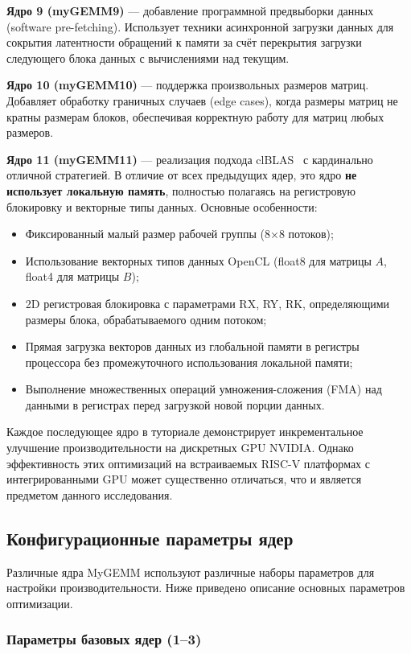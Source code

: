 \textbf{Ядро 9 (myGEMM9)} --- добавление программной предвыборки данных (software pre-fetching). Использует техники асинхронной загрузки данных для сокрытия латентности обращений к памяти за счёт перекрытия загрузки следующего блока данных с вычислениями над текущим.

\textbf{Ядро 10 (myGEMM10)} --- поддержка произвольных размеров матриц. Добавляет обработку граничных случаев (edge cases), когда размеры матриц не кратны размерам блоков, обеспечивая корректную работу для матриц любых размеров.

\textbf{Ядро 11 (myGEMM11)} --- реализация подхода clBLAS~\cite{clblas2015} с кардинально отличной стратегией. В отличие от всех предыдущих ядер, это ядро \textbf{не использует локальную память}, полностью полагаясь на регистровую блокировку и векторные типы данных. Основные особенности:

\begin{itemize}
    \item Фиксированный малый размер рабочей группы (8×8 потоков);
    \item Использование векторных типов данных OpenCL (float8 для матрицы $A$, float4 для матрицы $B$);
    \item 2D регистровая блокировка с параметрами RX, RY, RK, определяющими размеры блока, обрабатываемого одним потоком;
    \item Прямая загрузка векторов данных из глобальной памяти в регистры процессора без промежуточного использования локальной памяти;
    \item Выполнение множественных операций умножения-сложения (FMA) над данными в регистрах перед загрузкой новой порции данных.
\end{itemize}

Каждое последующее ядро в туториале демонстрирует инкрементальное улучшение производительности на дискретных GPU NVIDIA. Однако эффективность этих оптимизаций на встраиваемых RISC-V платформах с интегрированными GPU может существенно отличаться, что и является предметом данного исследования.

\subsection{Конфигурационные параметры ядер}

Различные ядра MyGEMM используют различные наборы параметров для настройки производительности. Ниже приведено описание основных параметров оптимизации.

\subsubsection{Параметры базовых ядер (1--3)}

